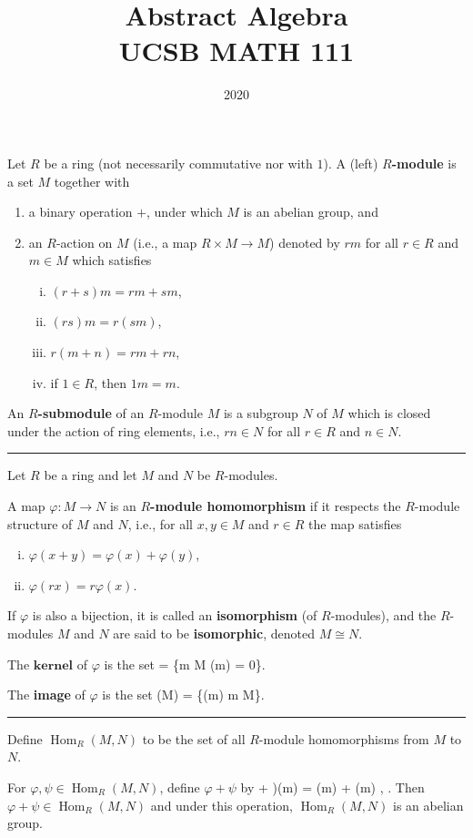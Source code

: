 \documentclass[12pt]{article}
\title{Abstract Algebra\\
    \large UCSB MATH 111
}
\author{}
\date{2020\textendash 2021}
\newcommand{\keyword}[1]{\textbf{#1}}
\def\[#1\]{\begin{align*}#1\end{align*}}
\newcommand{\sepline}{\rule{\textwidth}{0.4pt}}
\theoremstyle{definition}
\newcommand{\tc}[1]{, \qquad \text{#1}}
\renewcommand{\phi}{\varphi}
\newcommand{\<}{\left\langle}
\renewcommand{\>}{\right\rangle}
\newcommand{\isom}{\cong}
\DeclareMathOperator{\Hom}{Hom}
\begin{document}
Let $R$ be a ring (not necessarily commutative nor with $1$). A (left) \keyword{$R$-module} is a set $M$ together with
\begin{enumerate}[(1)]
    \item a binary operation $+$, under which $M$ is an abelian group, and
    \item an $R$-action on $M$ (i.e., a map $R \times M \to M$) denoted by $rm$ for all $r \in R$ and $m \in M$ which satisfies
    \begin{enumerate}[(i)]
        \item $(r + s)m = rm + sm$,
        \item $(rs)m = r(sm)$,
        \item $r(m + n) = rm + rn$,
        \item if $1 \in R$, then $1m = m$.
    \end{enumerate}
\end{enumerate}

An \keyword{$R$-submodule} of an $R$-module $M$ is a subgroup $N$ of $M$ which is closed under the action of ring elements, i.e., $rn \in N$ for all $r \in R$ and $n \in N$.



\sepline

Let $R$ be a ring and let $M$ and $N$ be $R$-modules.

A map $\phi : M \to N$ is an \keyword{$R$-module homomorphism} if it respects the $R$-module structure of $M$ and $N$, i.e., for all $x, y \in M$ and $r \in R$ the map satisfies
\begin{enumerate}[(i)]
    \item $\phi(x + y) = \phi(x) + \phi(y)$,
    \item $\phi(rx) = r\phi(x)$.
\end{enumerate}
If $\phi$ is also a bijection, it is called an \keyword{isomorphism} (of $R$-modules), and the $R$-modules $M$ and $N$ are said to be \keyword{isomorphic}, denoted $M \isom N$.

The $\keyword{kernel}$ of $\phi$ is the set
\[
    \ker\phi = \{m \in M \mid \phi(m) = 0\}.
\]

The \keyword{image} of $\phi$ is the set
\[
    \phi(M) = \{\phi(m) \mid m \in M\}.
\]

\sepline

Define $\Hom_R(M, N)$ to be the set of all $R$-module homomorphisms from $M$ to $N$.

For $\phi, \psi \in \Hom_R(M, N)$, define $\phi + \psi$ by
\[
    (\phi + \psi)(m) = \phi(m) + \psi(m) \tc{for all $m \in M$}.
\]
Then $\phi + \psi \in \Hom_R(M, N)$ and under this operation, $\Hom_R(M, N)$ is an abelian group.
\end{document}
